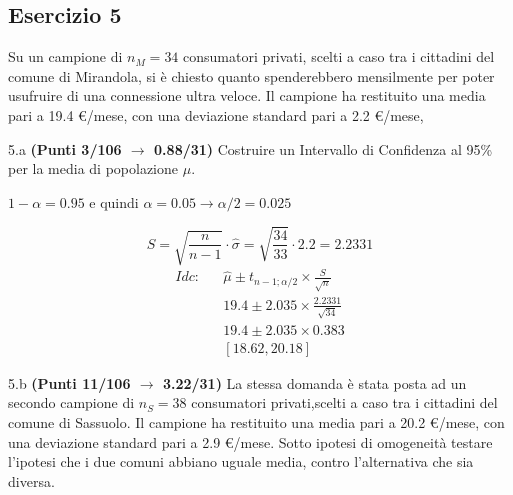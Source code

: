 \documentclass[
  11pt,
]{book}
\theoremstyle{mytheoremstyle}
\theoremstyle{mydefstyle}
\newenvironment{sol}
  {
  \begin{tcolorbox}[enhanced,breakable,arc=0.1mm,boxrule=1pt,colback=white,colframe=iblue,
  title=\bf \fontfamily{lmss}\selectfont \hspace{.5 cm} Soluzione,drop fuzzy shadow]

}{
\end{tcolorbox}
  }
\begin{document}
\subsection{Esercizio 5}\label{esercizio-5-11}

Su un campione di \(n_M=34\) consumatori privati, scelti a caso tra i cittadini del comune di Mirandola,
si è chiesto quanto spenderebbero mensilmente per poter usufruire di una connessione ultra veloce.
Il campione ha restituito una media pari a 19.4 €/mese, con una deviazione standard pari a 2.2 €/mese,

5.a \textbf{(Punti 3/106 \(\rightarrow\) 0.88/31)} Costruire un Intervallo di Confidenza al 95\% per la media di popolazione \(\mu\).

\begin{sol}
\(1-\alpha =0.95\) e quindi \(\alpha=0.05\rightarrow \alpha/2=0.025\)

\[
      S  =\sqrt{\frac {n}{n-1}}\cdot\hat\sigma =
     \sqrt{\frac { 34 }{ 33 }}\cdot 2.2 = 2.2331 
\]
\begin{eqnarray*}
  Idc: & &  \hat\mu \pm  t_{n-1;\alpha/2} \times \frac{S}{\sqrt{n}} \\
     & &  19.4 \pm  2.035 \times \frac{ 2.2331 }{\sqrt{ 34 }} \\
     & &  19.4 \pm  2.035 \times  0.383 \\
     & & [ 18.62 ,  20.18 ]
\end{eqnarray*}

\end{sol}

5.b \textbf{(Punti 11/106 \(\rightarrow\) 3.22/31)} La stessa domanda è stata posta ad un secondo campione di \(n_S=38\) consumatori privati,scelti a caso tra i cittadini del comune di Sassuolo.
Il campione ha restituito una media pari a 20.2 €/mese, con una deviazione standard pari a 2.9 €/mese. Sotto ipotesi di omogeneità testare l'ipotesi che i due comuni abbiano uguale media, contro l'alternativa che sia diversa.
\end{document}
